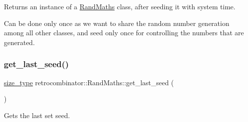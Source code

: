 Returns an instance of a \hyperlink{classretrocombinator_1_1RandMaths}{Rand\+Maths} class, after seeding it with system time. 

Can be done only once as we want to share the random number generation among all other classes, and seed only once for controlling the numbers that are generated. \mbox{\label{classretrocombinator_1_1RandMaths_ae3a186a8f3124cbfc698eeae09b708a0}} 
\subsubsection{\texorpdfstring{get\+\_\+last\+\_\+seed()}{get\_last\_seed()}}
{\footnotesize\ttfamily \hyperlink{namespaceretrocombinator_a8e1541b50cee66a791df4c437ccbb385}{size\+\_\+type} retrocombinator\+::\+Rand\+Maths\+::get\+\_\+last\+\_\+seed (\begin{DoxyParamCaption}{ }\end{DoxyParamCaption})\hspace{0.3cm}{\ttfamily [inline]}}



Gets the last set seed. 

